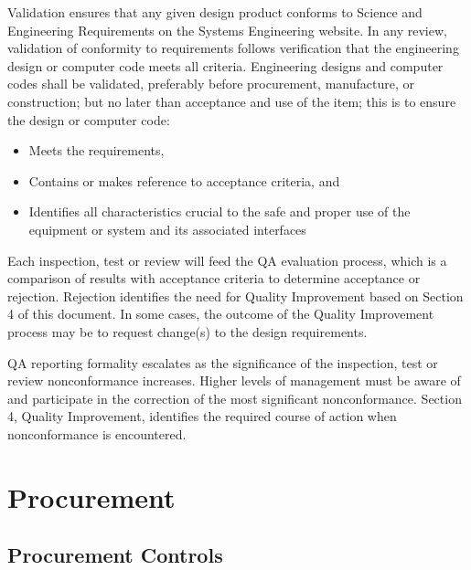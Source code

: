 Validation ensures that any given design product conforms to 
Science and Engineering Requirements on the Systems Engineering
website. In any review, validation of conformity to requirements
follows verification that the engineering design or computer code
meets all criteria. Engineering designs and computer codes shall be
validated, preferably before procurement, manufacture, or
construction; but no later than acceptance and use of the item; this
is to ensure the design or computer code:
\begin{itemize}
 \item Meets the  requirements,
 \item Contains or makes reference to acceptance criteria, and
 \item Identifies all characteristics crucial to the safe and proper
   use of the equipment or system and its associated interfaces
\end{itemize}

Each inspection, test or review will feed the QA evaluation process,
which is a comparison of results with acceptance criteria to determine
acceptance or rejection. Rejection identifies the need for Quality
Improvement based on Section 4 of this document. In some cases, the
outcome of the Quality Improvement process may be to request change(s)
to the design requirements.

QA reporting formality escalates as the significance of the
inspection, test or review nonconformance increases. Higher levels of
management must be aware of and participate in the correction of the
most significant nonconformance. Section 4, Quality Improvement,
identifies the required course of action when nonconformance is
encountered.

\section{Procurement}

\subsection{Procurement Controls}

